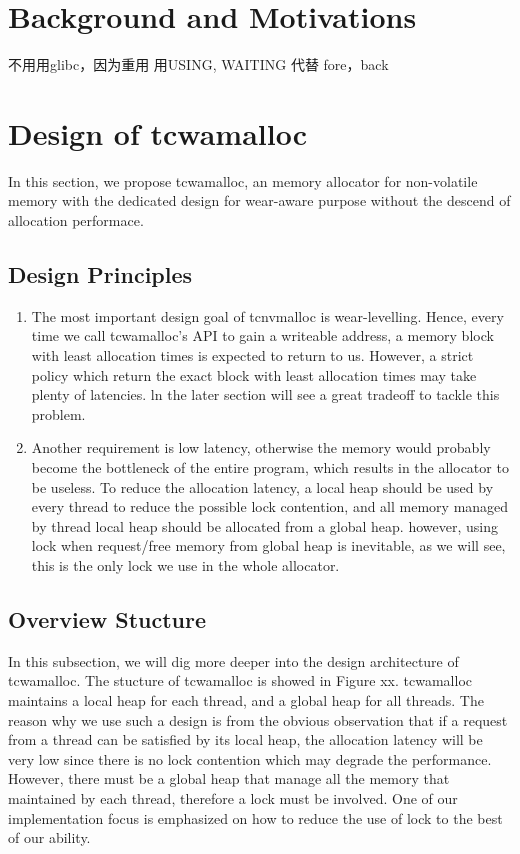 \documentclass{vldb}
\begin{document}
\section{Background and Motivations}

不用用glibc，因为重用
用USING, WAITING 代替 fore，back

\section{Design of tcwamalloc}

In this section, we propose tcwamalloc, an memory allocator for non-volatile memory with the dedicated design for wear-aware purpose without the descend of allocation performace.

\subsection{Design Principles}

\begin{enumerate}
    \item The most important design goal of tcnvmalloc is wear-levelling. Hence, every time we call tcwamalloc’s API to gain a writeable address, a memory block with least allocation times is expected to return to us. However, a strict policy which return the exact block with least allocation times may take plenty of latencies. ln the later section will see a great tradeoff to tackle this problem.
    \item Another requirement is low latency, otherwise the memory would probably become the bottleneck of the entire program, which results in the allocator to be useless. To reduce the allocation latency, a local heap should be used by every thread to reduce the possible lock contention, and all memory managed by thread local heap should be allocated from a global heap. however, using lock when request/free memory from global heap is inevitable, as we will see, this is the only lock we use in the whole allocator.
\end{enumerate}

\subsection{Overview Stucture}

In this subsection, we will dig more deeper into the design architecture of tcwamalloc. The stucture of tcwamalloc is showed in Figure xx. tcwamalloc maintains a local heap for each thread, and a global heap for all threads. The reason why we use such a design is from the obvious observation that if a request from a thread can be satisfied by its local heap, the allocation latency will be very low since there is no lock contention which may degrade the performance. However, there must be a global heap that manage all the memory that maintained by each thread, therefore a lock must be involved. One of our implementation focus is emphasized on how to reduce the use of lock to the best of our ability.
\end{document}
